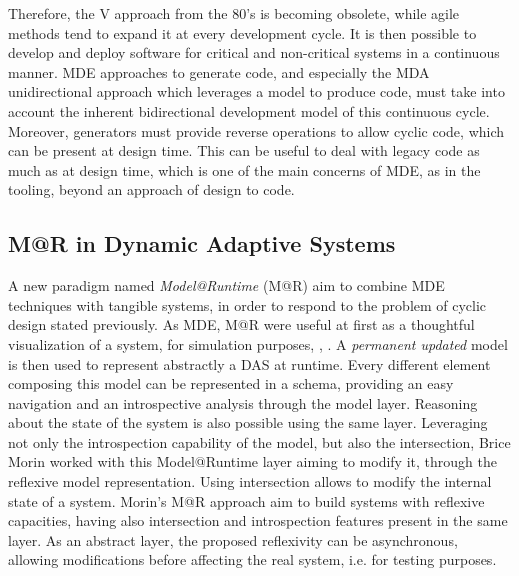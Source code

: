 Therefore, the V approach from the 80's is becoming obsolete, while agile methods tend to expand it at every development cycle.
It is then possible to develop and deploy software for critical and non-critical systems in a continuous manner.
MDE approaches to generate code, and especially the MDA unidirectional approach which leverages a model to produce code, must take into account the inherent bidirectional development model of this continuous cycle.
Moreover, generators must provide reverse operations to allow cyclic code, which can be present at design time.
This can be useful to deal with legacy code as much as at design time, which is one of the main concerns of MDE, as in the tooling, beyond an approach of design to code.

\subsection{M@R in Dynamic Adaptive Systems}
A new paradigm named \textit{Model@Runtime} (M@R) aim to combine MDE techniques with tangible systems, in order to respond to the problem of cyclic design stated previously.
As MDE, M@R were useful at first as a thoughtful visualization of a system, for simulation purposes\cite{oreizy1999architecture}, \cite{blair2009models}, \cite{zhang2006model}.
A \textit{permanent updated} model is then used to represent abstractly a DAS at runtime.
Every different element composing this model can be represented in a schema, providing an easy navigation and an introspective analysis through the model layer.
Reasoning about the state of the system is also possible using the same layer.
Leveraging not only the introspection capability of the model, but also the intersection, Brice Morin\cite{morin2010leveraging} worked with this Model@Runtime layer aiming to modify it, through the reflexive model representation.
Using intersection allows to modify the internal state of a system\cite{paepcke1993object}.
Morin's M@R approach aim to build systems with reflexive capacities, having also intersection and introspection features present in the same layer.
As an abstract layer, the proposed reflexivity can be asynchronous, allowing modifications before affecting the real system, i.e. for testing purposes. 

